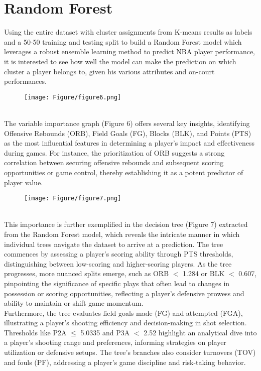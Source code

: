 \documentclass[fleqn,10pt]{SelfArx} %
\begin{document}
\section*{Random Forest}
Using the entire dataset with cluster assignments from K-means results as labels and a 50-50 training and testing split to build a Random Forest model which leverages a robust ensemble learning method to predict NBA player performance, it is interested to see how well the model can make the prediction on which cluster a player belongs to, given his various attributes and on-court performances.
\begin{figure}[ht]
    \centering
    \texttt{[image: Figure/figure6.png]}
    \label{fig:enter-label}
\end{figure}
\\The variable importance graph (Figure 6) offers several key insights, identifying Offensive Rebounds (ORB), Field Goals (FG), Blocks (BLK), and Points (PTS) as the most influential features in determining a player's impact and effectiveness during games. For instance, the prioritization of ORB suggests a strong correlation between securing offensive rebounds and subsequent scoring opportunities or game control, thereby establishing it as a potent predictor of player value.
\begin{figure}[ht]
    \centering
    \texttt{[image: Figure/figure7.png]}
    \label{fig:enter-label}
\end{figure}
\\This importance is further exemplified in the decision tree (Figure 7) extracted from the Random Forest model, which reveals the intricate manner in which individual trees navigate the dataset to arrive at a prediction. The tree commences by assessing a player's scoring ability through PTS thresholds, distinguishing between low-scoring and higher-scoring players. As the tree progresses, more nuanced splits emerge, such as ORB $<$ 1.284 or BLK $<$ 0.607, pinpointing the significance of specific plays that often lead to changes in possession or scoring opportunities, reflecting a player's defensive prowess and ability to maintain or shift game momentum.\\
Furthermore, the tree evaluates field goals made (FG) and attempted (FGA), illustrating a player's shooting efficiency and decision-making in shot selection. Thresholds like P2A $\leq$ 5.0335 and P3A $<$ 2.52 highlight an analytical dive into a player's shooting range and preferences, informing strategies on player utilization or defensive setups. The tree's branches also consider turnovers (TOV) and fouls (PF), addressing a player's game discipline and risk-taking behavior.\\
\end{document}

